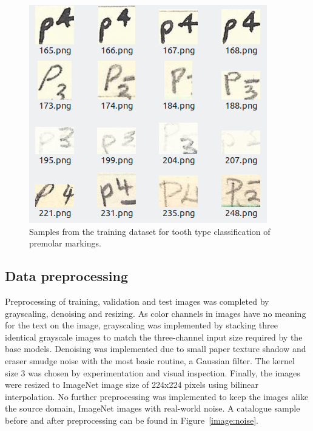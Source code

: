 \documentclass[english,twoside,openright]{UH_DS_MSc}
\begin{document}
\begin{figure}[ht]
    \centering
    \includegraphics*[scale=.5]{images/trainingsamples.png}
    \caption{Samples from the training dataset for tooth type classification of premolar markings.}
    \label{image:samples}
\end{figure}

\subsection{Data preprocessing}
 
Preprocessing of training, validation and test images was completed by grayscaling, denoising and resizing.
As color channels in images have no meaning for the text on the image, grayscaling was implemented by
 stacking three identical grayscale images
to match the three-channel input size required by the base models.
Denoising was implemented due to
small paper texture shadow and eraser smudge noise with the most basic routine, a Gaussian filter.
The kernel size 3 was chosen by experimentation and visual inspection. Finally, the images were resized to 
ImageNet image size of 224x224 pixels using bilinear interpolation.
No further preprocessing was implemented to keep the images alike the source domain, ImageNet images with real-world noise.
 A catalogue sample before and after preprocessing can 
be found in Figure~\ref{image:noise}.
\end{document}
